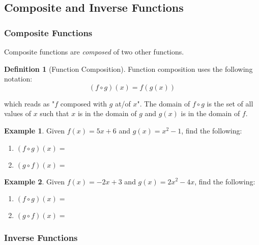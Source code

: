 \documentclass[addpoints,12pt]{exam}
\theoremstyle{definition}
\newtheorem{example}{Example}[subsection]
\newtheorem{definition}{Definition}[subsection]
\begin{document}
\setcounter{section}{8}
\setcounter{subsection}{3}

\subsection{Composite and Inverse Functions}

\subsubsection*{Composite Functions}

Composite functions are \emph{composed} of two other functions. 

\vspace{.2in}

\begin{definition}[Function Composition]
Function composition uses the following notation:
\[ (f\circ g)(x) = f(g(x))\]

which reads as "$f$ composed with $g$ at/of $x$". The domain of $f\circ g$ is the set of all values of $x$ such that $x$ is in the domain of $g$ and $g(x)$ is in the domain of $f$.
\end{definition}

\vspace{.25in}

\begin{example}
Given $f(x) = 5x+6$ and $g(x) = x^2-1$, find the following:
\begin{enumerate}
\item $(f\circ g)(x) = $
\vspace{1.5in}
\item $(g\circ f)(x) = $
\vspace{2.5in}
\end{enumerate}
\end{example}

\newpage

\begin{example}
Given $f(x) = -2x+3$ and $g(x) = 2x^2-4x$, find the following:
\begin{enumerate}
\item $(f\circ g)(x) = $
\vspace{1.5in}
\item $(g\circ f)(x) = $
\vspace{2.5in}
\end{enumerate}
\end{example}

\subsubsection*{Inverse Functions}
\end{document}
